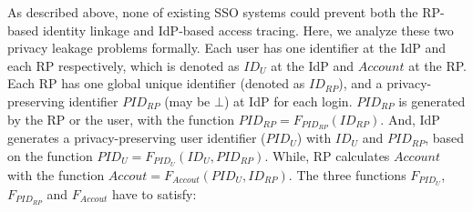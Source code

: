 As described above, none of existing SSO systems could prevent both the RP-based identity linkage and IdP-based access tracing.
Here, we analyze these two privacy leakage problems formally.
Each user has one identifier at the IdP and each RP respectively, which is denoted as $ID_U$ at the IdP and $Account$ at the RP.
Each RP has one global unique identifier (denoted as $ID_{RP}$), and a privacy-preserving identifier $PID_{RP}$ (may be $\bot$) at IdP for each login. 
$PID_{RP}$ is generated by the RP or the user, with the function $PID_{RP}=F_{PID_{RP}}(ID_{RP})$.
And, IdP generates a  privacy-preserving user identifier ($PID_U$) with $ID_U$ and $PID_{RP}$, based on the function  $PID_{U}=F_{PID_{U}}(ID_U, PID_{RP})$.
While,  RP calculates $Account$ with the function  $Accout=F_{Accout}(PID_U, ID_{RP})$.  
The three functions $F_{PID_{U}}$, $F_{PID_{RP}}$ and $F_{Accout}$  have to satisfy:
